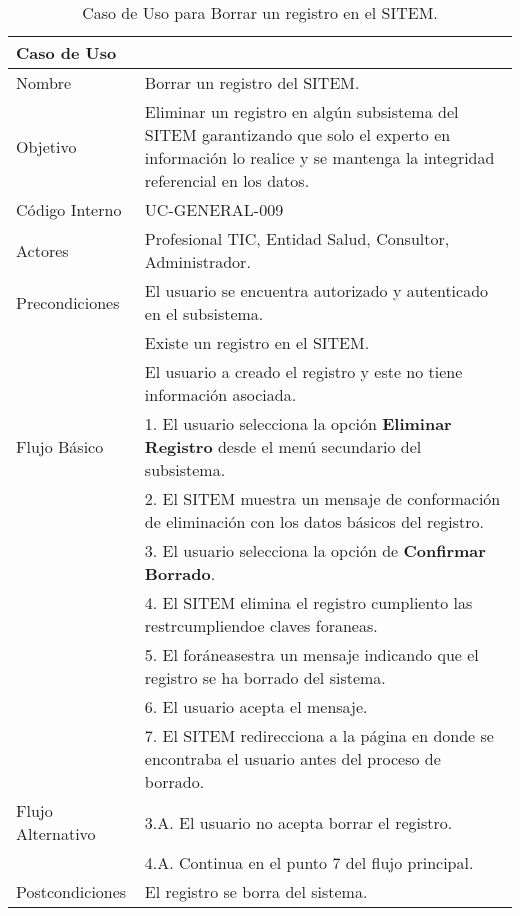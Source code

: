 \begin{table}
\begin{center}
\begin{tabular}{|l|p{10cm}|}
\hline
\textbf{Caso de Uso}&\\
\hline
Nombre & Borrar un registro del SITEM.\\
\hline
Objetivo & Eliminar un registro en algún subsistema del SITEM garantizando que solo el experto en información lo realice y se mantenga la integridad referencial en los datos.\\
\hline
Código Interno & UC-GENERAL-009\\
\hline
Actores & Profesional TIC, Entidad Salud, Consultor, Administrador.\\
\hline
Precondiciones & El usuario se encuentra autorizado y autenticado en el subsistema.\\
& Existe un registro en el SITEM.\\
& El usuario a creado el registro y este no tiene información asociada.\\
\hline
Flujo Básico & 1. El usuario selecciona la opción \textbf{Eliminar Registro} desde el menú secundario del subsistema.\\
& 2. El SITEM muestra un mensaje de conformación de eliminación con los datos básicos del registro.\\
& 3. El usuario selecciona la opción de \textbf{Confirmar Borrado}.\\
& 4. El SITEM elimina el registro cumpliento las restrcumpliendoe claves foraneas.\\
& 5. El foráneasestra un mensaje indicando que el registro se ha borrado del sistema.\\
& 6. El usuario acepta el mensaje.\\
& 7. El SITEM redirecciona a la página en donde se encontraba el usuario antes del proceso de borrado.\\
\hline
Flujo Alternativo & 3.A. El usuario no acepta borrar el registro. \\
& 4.A. Continua en el punto 7 del flujo principal.\\
\hline
Postcondiciones & El registro se borra del sistema.\\
\hline
\end{tabular}
\caption{Caso de Uso para Borrar un registro en el SITEM.}
\label{casouso9} 
\end{center}
\end{table}

